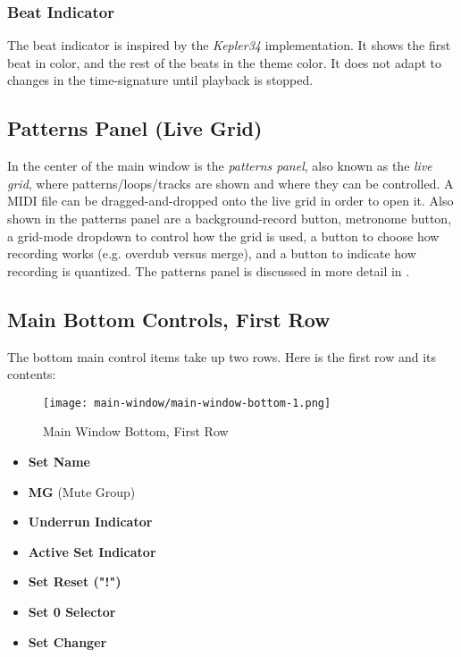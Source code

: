 \subsubsection{Beat Indicator}
\label{subsubsec:introduction_beat_indicator}

   The beat indicator is inspired by the \textsl{Kepler34} implementation.
   It shows the first beat in color, and the rest of the beats in the theme
   color.
   It does not adapt to changes in the time-signature until
   playback is stopped.

\subsection{Patterns Panel (Live Grid)}
\label{subsec:introduction_main_live_grid}

   In the center of the main window is the \textsl{patterns panel}, also 
   known as the \textsl{live grid}, where patterns/loops/tracks are shown
   and where they can be controlled.
   A MIDI file can be dragged-and-dropped onto the live grid in order
   to open it.
   Also shown in the patterns panel are a
   background-record button, metronome button, a
   grid-mode dropdown to control how the grid is used,
   a button to choose how recording works (e.g. overdub versus merge), and
   a button to indicate how recording is quantized.
   The patterns panel is discussed in more detail in
   .

\subsection{Main Bottom Controls, First Row}
\label{subsec:introduction_main_bottom_controls}

   The bottom main control items take up two rows.
   Here is the first row and its contents:

\begin{figure}[H]
   \centering 
   \texttt{[image: main-window/main-window-bottom-1.png]}
   \caption{Main Window Bottom, First Row}
   \label{fig:main_window_bottom_1}
\end{figure}

   \begin{itemize}
      \item \textbf{Set Name}
      \item \textbf{MG} (Mute Group)
      \item \textbf{Underrun Indicator}
      \item \textbf{Active Set Indicator}
      \item \textbf{Set Reset ("!")}
      \item \textbf{Set 0 Selector}
      \item \textbf{Set Changer}
   \end{itemize}

